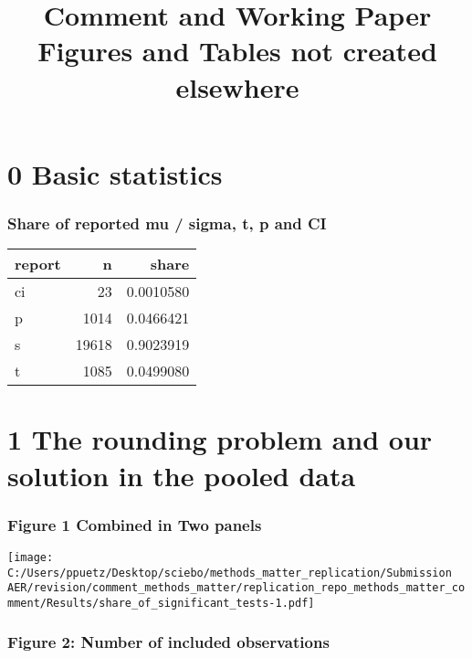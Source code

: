 \documentclass[
]{article}
\title{Comment and Working Paper Figures and Tables not created
elsewhere}
\author{}
\date{\vspace{-2.5em}}
\begin{document}
\maketitle

\hypertarget{basic-statistics}{%
\section{0 Basic statistics}\label{basic-statistics}}

\hypertarget{share-of-reported-mu-sigma-t-p-and-ci}{%
\subsubsection{Share of reported mu / sigma, t, p and
CI}\label{share-of-reported-mu-sigma-t-p-and-ci}}

\begin{longtable}[]{@{}lrr@{}}
\toprule
report & n & share \\
\midrule
\endhead
ci & 23 & 0.0010580 \\
p & 1014 & 0.0466421 \\
s & 19618 & 0.9023919 \\
t & 1085 & 0.0499080 \\
\bottomrule
\end{longtable}

\hypertarget{the-rounding-problem-and-our-solution-in-the-pooled-data}{%
\section{1 The rounding problem and our solution in the pooled
data}\label{the-rounding-problem-and-our-solution-in-the-pooled-data}}

\hypertarget{figure-1-combined-in-two-panels}{%
\subsubsection{Figure 1 Combined in Two
panels}\label{figure-1-combined-in-two-panels}}

\texttt{[image: C:/Users/ppuetz/Desktop/sciebo/methods\_matter\_replication/Submission AER/revision/comment\_methods\_matter/replication\_repo\_methods\_matter\_comment/Results/share\_of\_significant\_tests-1.pdf]}

\hypertarget{figure-2-number-of-included-observations}{%
\subsubsection{Figure 2: Number of included
observations}\label{figure-2-number-of-included-observations}}
\end{document}
